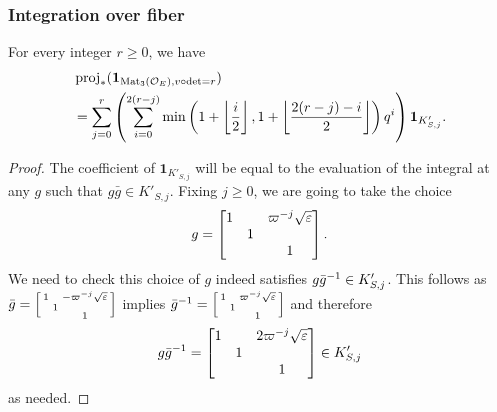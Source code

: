 \subsubsection{Integration over fiber}
\begin{proposition}
  For every integer $r \ge 0$, we have
  \begin{align*}
    &\operatorname{proj}_\ast(\mathbf{1}_{\operatorname{Mat}_3(\mathcal O_E), v\circ\det=r}) \\
    &= \sum_{j=0}^r \left(
      \sum_{i=0}^{2(r-j)} \min \left( 1 + \left\lfloor \frac i2 \right\rfloor,
        1 + \left\lfloor \frac{2(r-j)-i}{2} \right\rfloor \right) q^i \right)
        \mathbf{1}_{K'_{S,j}}.
  \end{align*}
\end{proposition}
\begin{proof}
  The coefficient of $\mathbf{1}_{K'_{S,j}}$ will be equal to
  the evaluation of the integral at any $g$ such that $g\bar{g} \in K'_{S,j}$.
  Fixing $j \ge 0$, we are going to take the choice
  \[
    g = \begin{bmatrix}
      1 &   & \varpi^{-j} \sqrt{\varepsilon} \\
      & 1 \\
      &   & 1
    \end{bmatrix}.
  \]
  We need to check this choice of $g$ indeed satisfies $g\bar{g}^{-1} \in K'_{S,j}$.
  This follows as
  $\bar{g} = \left[ \begin{smallmatrix} 1 &   & -\varpi^{-j} \sqrt{\varepsilon} \\ & 1 \\ &   & 1 \end{smallmatrix} \right]$
  implies
  $\bar{g}^{-1} = \left[ \begin{smallmatrix} 1 &   & \varpi^{-j} \sqrt{\varepsilon} \\ & 1 \\ &   & 1 \end{smallmatrix} \right]$
  and therefore
  \[
    g\bar{g}^{-1} = \begin{bmatrix}
      1 &   & 2\varpi^{-j} \sqrt{\varepsilon} \\
      & 1 \\
      &   & 1
    \end{bmatrix} \in K'_{S,j}
  \]
  as needed.


\end{proof}
